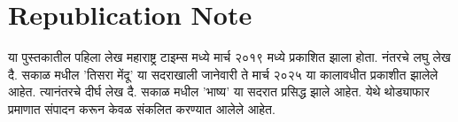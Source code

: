 \chapter*{Republication Note}

या पुस्तकातील पहिला लेख महाराष्ट्र टाइम्स मध्ये मार्च २०१९ मध्ये प्रकाशित झाला होता.  नंतरचे लघु लेख दै. सकाळ मधील 'तिसरा मेंदू' या सदराखाली जानेवारी ते मार्च २०२५  या कालावधीत प्रकाशीत झालेले आहेत.  त्यानंतरचे दीर्घ लेख दै. सकाळ मधील 'भाष्य'  या सदरात प्रसिद्ध झाले आहेत.  येथे थोड्याफार प्रमाणात संपादन करून केवळ संकलित करण्यात आलेले आहेत. 